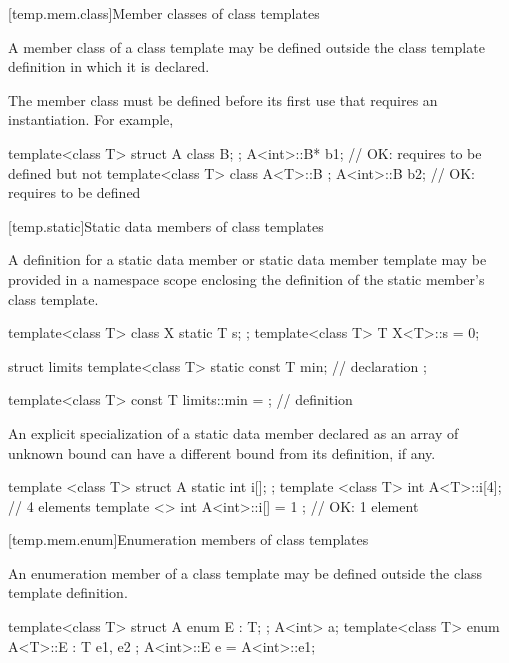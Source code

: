 [temp.mem.class]{Member classes of class templates}

\pnum
A member class of a class template may be defined outside the class template
definition in which it is declared.
\begin{note}
The member class must be defined before its first use that requires
an instantiation.
For example,

\begin{codeblock}
template<class T> struct A {
  class B;
};
A<int>::B* b1;                          // OK: requires  to be defined but not 
template<class T> class A<T>::B { };
A<int>::B  b2;                          // OK: requires  to be defined
\end{codeblock}
\end{note}

[temp.static]{Static data members of class templates}

\pnum
{}%
A definition for a static data member or static data member template may be
provided in a namespace scope enclosing the definition of the static member's
class template.
\begin{example}

\begin{codeblock}
template<class T> class X {
  static T s;
};
template<class T> T X<T>::s = 0;

struct limits {
  template<class T>
    static const T min;                 // declaration
};

template<class T>
  const T limits::min = { };            // definition
\end{codeblock}
\end{example}

\pnum
An explicit specialization of a static data member declared as an array of unknown
bound can have a different bound from its definition, if any. \begin{example}

\begin{codeblock}
template <class T> struct A {
  static int i[];
};
template <class T> int A<T>::i[4];      // 4 elements
template <> int A<int>::i[] = { 1 };    // OK: 1 element
\end{codeblock}
\end{example}

[temp.mem.enum]{Enumeration members of class templates}

\pnum
An enumeration member of a class template may be defined outside the class
template definition.
\begin{example}
\begin{codeblock}
template<class T> struct A {
  enum E : T;
};
A<int> a;
template<class T> enum A<T>::E : T { e1, e2 };
A<int>::E e = A<int>::e1;
\end{codeblock}
\end{example}

